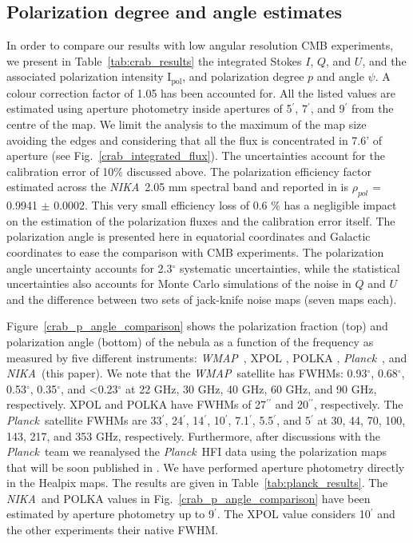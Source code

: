 \documentclass[twocolumn,traditabstract]{aa}
\def\NIKA{\textit{NIKA}}
\def\Planck{\textit{Planck}}
\def\WMAP{\textit{WMAP}}
\begin{document}
\subsection{Polarization degree and angle estimates}
In order to compare our results with low angular resolution CMB experiments, we present in Table~\ref{tab:crab_results} the integrated Stokes $I$, $Q$, and $U$, and the associated polarization intensity I$_\textrm{pol}$, and polarization degree $p$ and angle $\psi$. A colour correction factor of 1.05 has been accounted for. All the listed values are estimated using aperture photometry inside apertures of 5$^\prime$, 7$^\prime$, and 9$^\prime$ from the centre of the map. We limit the analysis to the maximum of the map size avoiding the edges and considering that all the flux is concentrated in 7.6' of aperture (see Fig.~\ref{crab_integrated_flux}). The uncertainties account for the calibration error of 10\% discussed above. 
The polarization efficiency factor estimated across the \NIKA\ 2.05 mm spectral band and reported in \cite{ritacco2017} is $\rho_{pol}$ = 0.9941 $\pm$ 0.0002. This very small efficiency loss of 0.6 \% has a negligible impact on the estimation of the polarization fluxes and the calibration error itself. 
The polarization angle is  presented here in equatorial coordinates and Galactic coordinates to ease the comparison with CMB experiments.
The polarization angle uncertainty accounts for 2.3$^{\circ}$ systematic uncertainties, while the statistical uncertainties also accounts  for Monte Carlo simulations of the noise in $Q$ and $U$ and the difference between two sets of jack-knife noise maps (seven maps each).

Figure~\ref{crab_p_angle_comparison} shows the polarization fraction (top) and polarization angle (bottom) of the  nebula as a function of the frequency as measured by five different instruments: 
\WMAP\ \citep{2011ApJS..192...19W}, XPOL \citep{aumont2010}, POLKA \citep{2014PASP..126.1027W}, \Planck\ \citep{2015arXiv150702058P}, and \NIKA\ (this paper). 
We note that the \WMAP\ satellite has FWHMs: 0.93$^{\circ}$, 0.68$^{\circ}$, 0.53$^{\circ}$, 0.35$^{\circ}$, and \textless 0.23$^{\circ}$ at 22 GHz, 30 GHz, 40 GHz, 60 GHz, and 90 GHz, respectively. XPOL and POLKA have FWHMs of 27$^{\prime\prime}$ and 20$^{\prime\prime}$, respectively.
The \Planck\ satellite FWHMs are 33$^{\prime}$, 24$^{\prime}$, 14$^{\prime}$, 10$^{\prime}$, 7.1$^{\prime}$, 5.5$^{\prime}$, and 5$^{\prime}$ at 30, 44, 70, 100, 143, 217, and 353 GHz, respectively. Furthermore, after discussions with the \Planck\ team we  reanalysed the \Planck\ HFI data using the polarization maps that will be soon published in \cite{planck2018}. We have performed aperture photometry directly in the Healpix maps. The results are given in Table~\ref{tab:planck_results}.
The \NIKA\ and POLKA values in Fig.~\ref{crab_p_angle_comparison} have been estimated by aperture photometry up to 9$^{\prime}$. The XPOL value considers 10$^{\prime}$ \citep{aumont2010} and the other experiments their native FWHM.
\end{document}
